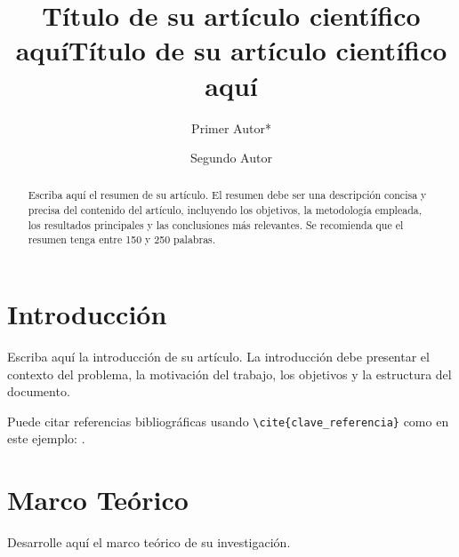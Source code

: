 \documentclass{syx7}
\title{Título de su artículo científico aquí}
\begin{document}

\title{Título de su artículo científico aquí}
\author{Primer Autor*}
\author{Segundo Autor}

\vspace*{-1 \baselineskip}

\maketitle

\begin{abstract}
	Escriba aquí el resumen de su artículo. El resumen debe ser una descripción concisa y precisa del contenido del artículo, incluyendo los objetivos, la metodología empleada, los resultados principales y las conclusiones más relevantes. Se recomienda que el resumen tenga entre 150 y 250 palabras.
\end{abstract}

\section{Introducción}
Escriba aquí la introducción de su artículo. La introducción debe presentar el contexto del problema, la motivación del trabajo, los objetivos y la estructura del documento.

Puede citar referencias bibliográficas usando \texttt{\textbackslash cite\{clave\_referencia\}} como en este ejemplo: \cite{ejemplo_referencia}.

\section{Marco Teórico}
Desarrolle aquí el marco teórico de su investigación.
\end{document}
